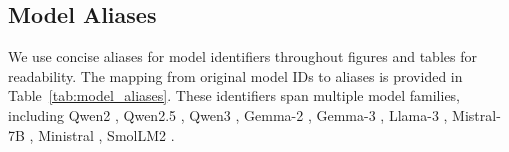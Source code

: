 \subsection{Model Aliases}
We use concise aliases for model identifiers throughout figures and tables for readability. The mapping from original model IDs to aliases is provided in Table~\ref{tab:model_aliases}.
These identifiers span multiple model families, including Qwen2 \citep{yang2024qwen2}, Qwen2.5 \citep{yang2024qwen2.5}, Qwen3 \citep{yang2025qwen3}, Gemma-2 \citep{gemmateam2024gemma2}, Gemma-3 \citep{gemmateam2025gemma3}, Llama-3 \citep{dubey2024llama3}, Mistral-7B \citep{jiang2023mistral7b}, Ministral \citep{mistral2024ministral}, SmolLM2 \citep{allal2025smollm2}.


